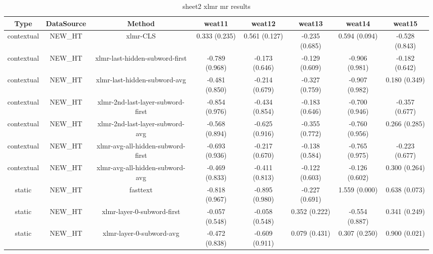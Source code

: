 \begin{sidewaystable}[htb]
    \centering
    \caption{sheet2 xlmr mr results}
    \label{appendix_tab:sheet2_xlmr_mr_results}
    \small
    \begin{tabular}{@{}cccccccc@{}}
        \toprule
        Type & DataSource & Method & weat11 & weat12 & weat13 & weat14 & weat15 \\
        \midrule
        contextual & NEW\_HT & xlmr-CLS & 0.333 (0.235) & 0.561 (0.127) & -0.235 (0.685) & 0.594 (0.094) & -0.528 (0.843) \\
        contextual & NEW\_HT & xlmr-last-hidden-subword-first & -0.789 (0.968) & -0.173 (0.646) & -0.129 (0.609) & -0.906 (0.981) & -0.182 (0.642) \\
        contextual & NEW\_HT & xlmr-last-hidden-subword-avg & -0.481 (0.850) & -0.214 (0.679) & -0.327 (0.759) & -0.907 (0.982) & 0.180 (0.349) \\
        contextual & NEW\_HT & xlmr-2nd-last-layer-subword-first & -0.854 (0.976) & -0.434 (0.854) & -0.183 (0.646) & -0.700 (0.946) & -0.357 (0.677) \\
        contextual & NEW\_HT & xlmr-2nd-last-layer-subword-avg & -0.568 (0.894) & -0.625 (0.916) & -0.355 (0.772) & -0.760 (0.956) & 0.266 (0.285) \\
        contextual & NEW\_HT & xlmr-avg-all-hidden-subword-first & -0.693 (0.936) & -0.217 (0.670) & -0.138 (0.584) & -0.765 (0.975) & -0.223 (0.677) \\
        contextual & NEW\_HT & xlmr-avg-all-hidden-subword-avg & -0.469 (0.833) & -0.411 (0.813) & -0.122 (0.603) & -0.126 (0.602) & 0.300 (0.264) \\
        static & NEW\_HT & fasttext & -0.818 (0.967) & -0.895 (0.980) & -0.227 (0.691) & 1.559 (0.000) & 0.638 (0.073) \\
        static & NEW\_HT & xlmr-layer-0-subword-first & -0.057 (0.548) & -0.058 (0.548) & 0.352 (0.222) & -0.554 (0.887) & 0.341 (0.249) \\
        static & NEW\_HT & xlmr-layer-0-subword-avg & -0.472 (0.838) & -0.609 (0.911) & 0.079 (0.431) & 0.307 (0.250) & 0.900 (0.021) \\
        \bottomrule
    \end{tabular}
\end{sidewaystable}